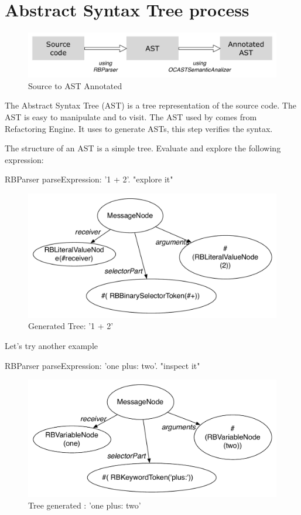 \documentclass[a4paper,10pt,twoside]{book}
\begin{document}
\section{Abstract Syntax Tree process}

\begin{figure}[ht]\centering
	\includegraphics[width=\linewidth]{SourceToAnnotatedAST}
	\caption{Source to AST Annotated }
\end{figure}

The Abstract Syntax Tree (AST) is a tree representation of the source code. The AST is easy to manipulate and to visit. The AST used by \opal comes from Refactoring Engine. It uses  to generate ASTs, this step verifies the syntax.

The structure of an AST is a simple tree. Evaluate and explore the following expression:

\begin{code}{}
RBParser parseExpression: '1 + 2'.
"explore it"
\end{code}



\begin{figure}[ht]
	\centering
	\includegraphics[width=0.7\linewidth]{SimpleAtomicExpression}
	\caption{Generated Tree: '1 + 2'  }
\end{figure}

Let's try another example
\begin{code}{}
RBParser parseExpression: 'one plus: two'.
"inspect it"
\end{code}


\begin{figure}[ht]\centering
	\includegraphics[width=0.7\linewidth]{SimpleAtomicExpressionP}
	\caption{Tree generated : 'one plus: two' }
\end{figure}
\end{document}
